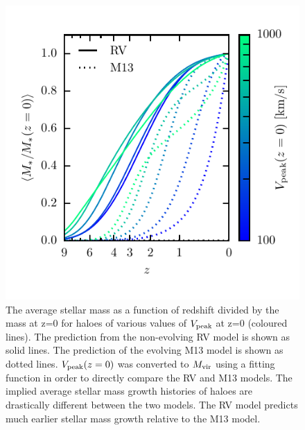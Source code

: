 \documentclass[a4paper,fleqn,usenatbib]{mnras}
\begin{document}
\begin{figure}
    \includegraphics{figures/mstar_of_z_rm.pdf}
    \caption{The average stellar mass as a function of redshift divided by the mass at z=0 for haloes of various values of $V_{\rm peak}$ at z=0 (coloured lines).  The prediction from the non-evolving RV model is shown as solid lines.  The prediction of the evolving M13 model is shown as dotted lines.  $V_{\rm peak}(z=0)$ was converted to $M_{\rm vir}$ using a fitting function in order to directly compare the RV and M13 models.  The implied average stellar mass growth histories of haloes are drastically different between the two models.  The RV model predicts {\rm much} earlier stellar mass growth relative to the M13 model.}
    \label{fig:mstar_of_z_rm}
\end{figure}
\end{document}
